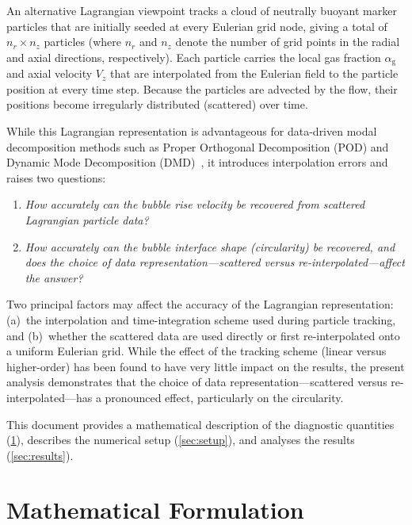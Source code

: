 \documentclass[11pt,a4paper]{article}
\newcommand{\alphag}{\alpha_{\mathrm{g}}}
\newcommand{\Vz}{V_z}
\begin{document}
An alternative Lagrangian viewpoint tracks a cloud of neutrally buoyant
marker particles that are initially seeded at every Eulerian grid node,
giving a total of $n_r \times n_z$ particles (where $n_r$ and $n_z$ denote
the number of grid points in the radial and axial directions, respectively).
Each particle carries the local gas fraction $\alphag$ and axial velocity
$\Vz$ that are interpolated from the Eulerian field to the particle
position at every time step.  Because the particles are advected by the
flow, their positions become irregularly distributed (scattered) over time.

While this Lagrangian representation is advantageous for data-driven modal
decomposition methods such as Proper Orthogonal Decomposition (POD) and
Dynamic Mode Decomposition (DMD)~\cite{main_paper}, it introduces
interpolation errors and raises two questions:
\begin{enumerate}[label=(\roman*)]
  \item \emph{How accurately can the bubble rise velocity be recovered from
    scattered Lagrangian particle data?}
  \item \emph{How accurately can the bubble interface shape (circularity) be
    recovered, and does the choice of data representation---scattered versus
    re-interpolated---affect the answer?}
\end{enumerate}

Two principal factors may affect the accuracy of the Lagrangian
representation: (a)~the interpolation and time-integration scheme used
during particle tracking, and (b)~whether the scattered data are used
directly or first re-interpolated onto a uniform Eulerian grid.  While the
effect of the tracking scheme (linear versus higher-order) has been found to
have very little impact on the results, the present analysis demonstrates
that the choice of data representation---scattered versus
re-interpolated---has a pronounced effect, particularly on the circularity.

This document provides a mathematical description of the diagnostic
quantities (\cref{sec:formulation}), describes the numerical setup
(\cref{sec:setup}), and analyses the results (\cref{sec:results}).


\section{Mathematical Formulation}\label{sec:formulation}
\end{document}
